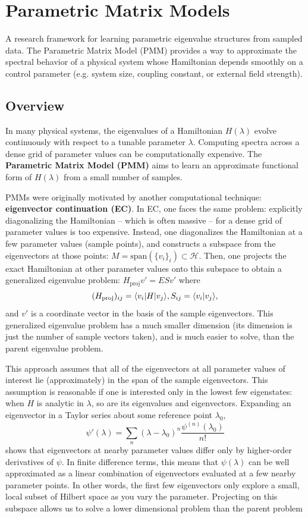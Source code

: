\section{Parametric Matrix Models}
A research framework for learning parametric eigenvalue structures from sampled data.  
The Parametric Matrix Model (PMM) provides a way to approximate the spectral behavior of a physical system whose Hamiltonian depends smoothly on a control parameter (e.g. system size, coupling constant, or external field strength).

\subsection{Overview}

In many physical systems, the eigenvalues of a Hamiltonian $H(\lambda)$ evolve continuously with respect to a tunable parameter $\lambda$.  
Computing spectra across a dense grid of parameter values can be computationally expensive. The \textbf{Parametric Matrix Model (PMM)} aims to learn an approximate functional form of $H(\lambda)$ from a small number of samples.

PMMs were originally motivated by another computational technique: \textbf{eigenvector continuation (EC)}. In EC, one faces the same problem: explicitly diagonalizing the Hamiltonian -- which is often massive -- for a dense grid of parameter 
values is too expensive. Instead, one diagonalizes the Hamiltonian at a few parameter values (sample points), and constructs a subspace from the eigenvectors at those points: $M=\text{span}(\lbrace v_i\rbrace_i)\subset\mathcal{H}$. 
Then, one projects the exact Hamiltonian at other parameter values onto this subspace to obtain a generalized eigenvalue problem: $H_{\text{proj}}v' = ESv'$ where 
$$
(H_{\text{proj}})_{ij}=\langle v_i|H|v_j\rangle, \\
S_{ij}=\langle v_i | v_j\rangle,
$$
and $v'$ is a coordinate vector in the basis of the sample eigenvectors. This generalized eigenvalue problem has a much smaller dimension (its dimension is just the number of sample vectors taken), and is much easier to solve, than the parent eigenvalue problem.

This approach assumes that all of the eigenvectors at all parameter values of interest lie (approximately) in the span of the sample eigenvectors. This assumption is reasonable if one is interested only in the lowest few eigenstates: when $H$ is analytic in $\lambda$, 
so are its eigenvalues and eigenvectors. Expanding an eigenvector in a Taylor series about some reference point $\lambda_0$, 
$$
\psi'(\lambda) = \sum_n (\lambda-\lambda_0)^n \frac{\psi^{(n)}(\lambda_0)}{n!}
$$
shows that eigenvectors at nearby parameter values differ only by higher-order derivatives of $\psi$. In finite difference terms, this means that $\psi(\lambda)$ can be well approximated as a linear combination of eigenvectors evaluated at a few nearby parameter points. 
In other words, the first few eigenvectors only explore a small, local subset of Hilbert space as you vary the parameter. Projecting on this subspace allows us to solve a lower dimensional problem than the parent problem

